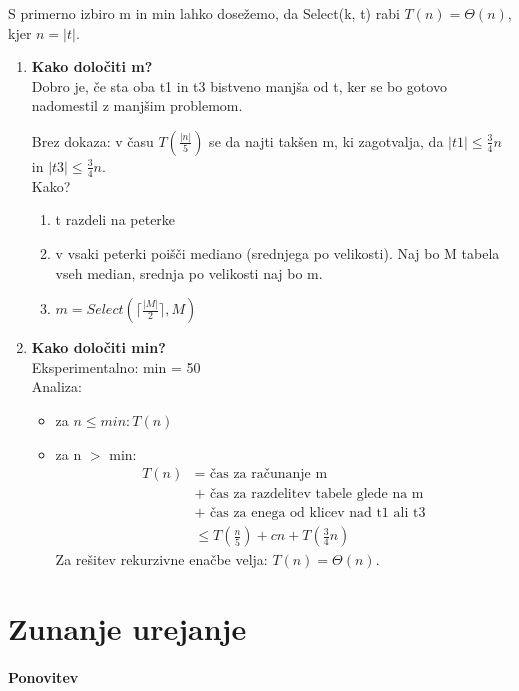 \documentclass[a4paper,10pt]{article}
\begin{document}
S primerno izbiro m in min lahko dose\v zemo, da Select(k, t) rabi $T(n) = \Theta (n)$, kjer $n = |t|$.
\begin{enumerate}
\item \textbf{Kako dolo\v citi m?} \\
	Dobro je, \v ce sta oba t1 in t3 bistveno manj\v sa od t, ker se bo gotovo nadomestil z manj\v sim problemom.

	Brez dokaza: v \v casu $T(\frac{|n|}{5})$ se da najti tak\v sen m, ki zagotvalja, da $|t1| \leq \frac{3}{4}n$ in $|t3| \leq \frac{3}{4}n$.\\
	Kako?
	\begin{enumerate}
	\item t razdeli na peterke
	\item v vsaki peterki poi\v s\v ci mediano (srednjega po velikosti). Naj bo M tabela vseh median, srednja po velikosti naj bo m.
	\item $m = Select(\lceil \frac{\vert M \vert }{2} \rceil, M)$
	\end{enumerate}
\item \textbf{Kako dolo\v citi min?} \\
	Eksperimentalno: min = 50 \\
	Analiza:
	\begin{itemize}
	\item za $n \leq min: T(n)$
	\item za n $>$ min:
		$$
		\begin{array}{ll}
		T(n) & = \mbox{ \v cas za ra\v cunanje m} \\
		 & + \mbox{ \v cas za razdelitev tabele glede na m} \\
		 & + \mbox{ \v cas za enega od klicev nad t1 ali t3} \\
		 & \leq T(\frac{n}{5}) + cn + T(\frac{3}{4} n)
		\end{array}
		$$
	Za re\v sitev rekurzivne ena\v cbe velja: $T(n) = \Theta (n)$.
	\end{itemize}
\end{enumerate}


\section{Zunanje urejanje}

\paragraph{Ponovitev}
\end{document}
